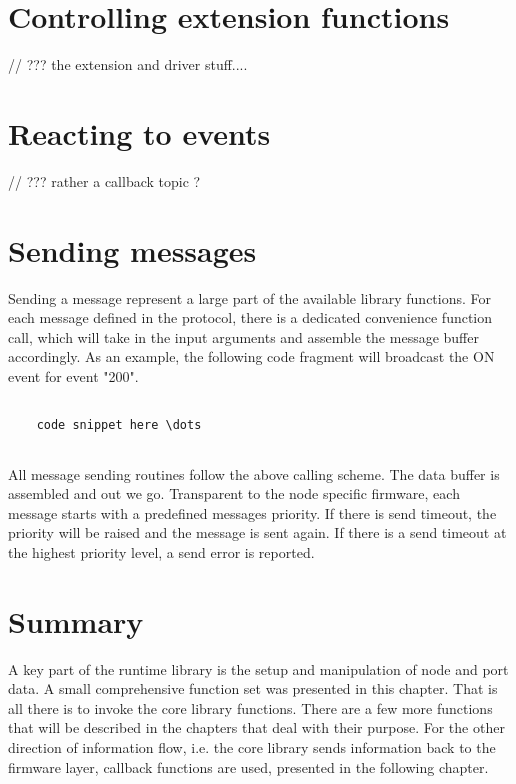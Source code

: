 \section{Controlling extension functions}

// ??? the extension and driver stuff....

\section{Reacting to events}


// ??? rather a callback topic ?


\section{Sending messages}

Sending a message represent a large part of the available library functions. For each message defined in the protocol, there is a dedicated convenience function call, which will take in the input arguments and assemble the message buffer accordingly. As an example, the following code fragment will broadcast the ON event for event "200".

\lstset{language=c++, style=codesnippetstyle}
\begin{lstlisting}
   
    code snippet here \dots
    
\end{lstlisting}

All message sending routines follow the above calling scheme. The data buffer is assembled and out we go. Transparent to the node specific firmware, each message starts with a predefined messages priority. If there is send timeout, the priority will be raised and the message is sent again. If there is a send timeout at the highest priority level, a send error is reported.

\section{Summary}

A key part of the runtime library is the setup and manipulation of node and port data. A small comprehensive function set was presented in this chapter. That is all there is to invoke the core library functions. There are a few more functions that will be described in the chapters that deal with their purpose. For the other direction of information flow, i.e. the core library sends information back to the firmware layer, callback functions are used, presented in the following chapter.
